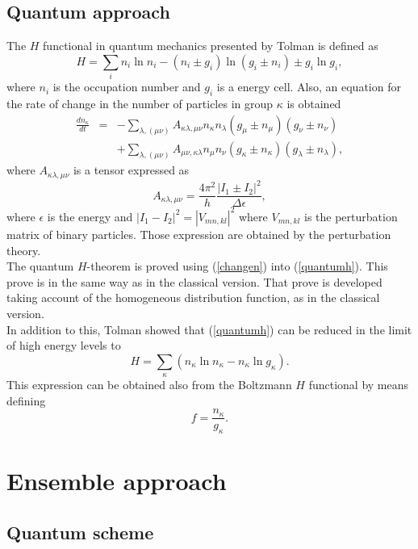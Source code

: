 \documentclass{article}
\begin{document}
\subsection{Quantum approach}
The $H$ functional in quantum mechanics presented by Tolman \cite{tolman} is defined as 
\begin{equation}
    H=\sum_i n_i \ln n_i -(n_i\pm g_i)\ln (g_i \pm n_i)\pm g_i\ln g_i, \label{quantumh}
\end{equation}
where $n_i$ is the occupation number and $g_i$ is a energy cell. Also, an equation for the rate of change in the number of particles in group $\kappa$ is obtained
\begin{eqnarray}
    \frac{d n_{\kappa}}{dt}&=&-\sum_{\lambda,(\mu \nu)}A_{\kappa\lambda,\mu\nu} n_{\kappa}n_{\lambda}(g_{\mu}\pm n_{\mu})(g_{\nu}\pm n_{\nu})\nonumber \\
    &&+\sum_{\lambda,(\mu \nu)}A_{\mu\nu,\kappa\lambda} n_{\mu}n_{\nu}(g_{\kappa}\pm n_{\kappa})(g_{\lambda}\pm n_{\lambda}),\label{changen}
\end{eqnarray}
where $A_{\kappa\lambda,\mu\nu}$ is a tensor expressed as
\begin{equation}
  A_{\kappa\lambda,\mu\nu}=\frac{4\pi^{2}}{h}\frac{|I_1\pm I_2|^2}{\Delta \epsilon},
\end{equation}
where $\epsilon$ is the energy and $|I_1-I_2|^2=|V_{mn,kl}|^2$ where $V_{mn,kl}$ is the perturbation matrix of binary particles. Those expression are obtained by the perturbation theory.\\
The quantum $H$-theorem is proved using (\ref{changen}) into (\ref{quantumh}). This prove is in the same way as in the classical version.  That prove is developed taking account of the homogeneous distribution function, as in the classical version.\\
In addition to this, Tolman showed that (\ref{quantumh}) can be reduced in the limit of high energy levels to
\begin{equation}
    H = \sum_{\kappa} (n_{\kappa} \ln n_{\kappa} - n_{\kappa} \ln g_{\kappa}).
\end{equation}
This expression can be obtained also from the Boltzmann $H$ functional by means defining 
\begin{equation}
    f=\frac{n_{\kappa}}{ g_{\kappa}}.
\end{equation}
\section{Ensemble approach}
\subsection{Quantum scheme}
\end{document}
